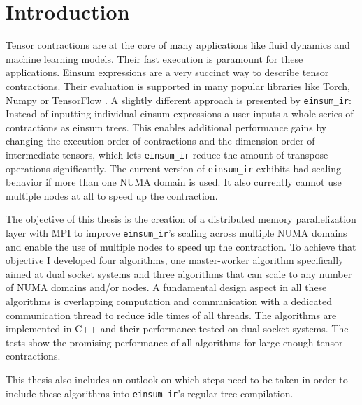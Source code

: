 \section{Introduction}

Tensor contractions are at the core of many applications like fluid dynamics and machine learning models.
Their fast execution is paramount for these applications.
Einsum expressions are a very succinct way to describe tensor contractions.
Their evaluation is supported in many popular libraries like Torch\cite{torch}, Numpy\cite{numpy} or TensorFlow \cite{tensorflow}.
A slightly different approach is presented by \texttt{einsum\_ir}\cite{einsum_ir}:
Instead of inputting individual einsum expressions a user inputs a whole series of contractions as einsum trees.
This enables additional performance gains by changing the execution order of contractions and the dimension order of intermediate tensors, which lets \texttt{einsum\_ir} reduce the amount of transpose operations significantly.
The current version of \texttt{einsum\_ir} exhibits bad scaling behavior if more than one NUMA domain is used.
It also currently cannot use multiple nodes at all to speed up the contraction.

The objective of this thesis is the creation of a distributed memory parallelization layer with MPI to improve \texttt{einsum\_ir}'s scaling across multiple NUMA domains and enable the use of multiple nodes to speed up the contraction.
To achieve that objective I developed four algorithms, one master-worker algorithm specifically aimed at dual socket systems and three algorithms that can scale to any number of NUMA domains and/or nodes.
A fundamental design aspect in all these algorithms is overlapping computation and communication with a dedicated communication thread to reduce idle times of all threads.
The algorithms are implemented in C++ and their performance tested on dual socket systems.
The tests show the promising performance of all algorithms for large enough tensor contractions.

This thesis also includes an outlook on which steps need to be taken in order to include these algorithms into \texttt{einsum\_ir}'s regular tree compilation.


